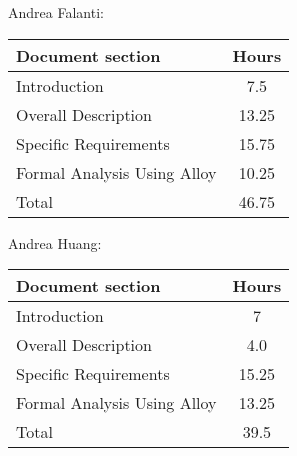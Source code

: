 Andrea Falanti:

\begin{tabular}{|l|c|}
    \hline
    Document section & Hours \\
    \hline
     Introduction & 7.5\\
     Overall Description & 13.25\\
     Specific Requirements & 15.75\\
     Formal Analysis Using Alloy & 10.25\\
     \hline
     Total & 46.75\\
     \hline
\end{tabular}
\vskip 0.3in

Andrea Huang:

\begin{tabular}{|l|c|}
    \hline
    Document section & Hours \\
    \hline
     Introduction &  7\\
     Overall Description & 4.0\\
     Specific Requirements & 15.25\\
     Formal Analysis Using Alloy & 13.25\\
     \hline
     Total & 39.5\\
     \hline
\end{tabular}